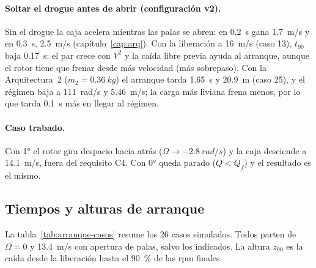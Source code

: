 \paragraph{Soltar el drogue antes de abrir (configuración v2).} Sin el drogue la caja
acelera mientras las palas se abren: en \SI{0.2}{s} gana \SI{1.7}{m/s} y en \SI{0.3}{s},
\SI{2.5}{m/s} (capítulo~\ref{cap:arq}). Con la liberación a \SI{16}{m/s} (caso 13),
$t_{90}$ baja \SI{0.17}{s}: el par crece con $V^2$ y la caída libre previa ayuda al
arranque, aunque el rotor tiene que frenar desde más velocidad (más sobrepaso). Con la
Arquitectura~2 ($m_2=\SI{0.36}{kg}$) el arranque tarda \SI{1.65}{s} y \SI{20.9}{m}
(caso 25), y el régimen baja a \SI{111}{rad/s} y \SI{5.46}{m/s}; la carga más liviana frena
menos, por lo que tarda \SI{0.1}{s} más en llegar al régimen.

\paragraph{Caso trabado.} Con \ang{+1} el rotor gira despacio hacia atrás
($\Omega\to\SI{-2.8}{rad/s}$) y la caja desciende a \SI{14.1}{m/s}, fuera del requisito
C4. Con \ang{0} queda parado ($Q<Q_f$) y el resultado es el mismo.

\subsection{Tiempos y alturas de arranque}

La tabla~\ref{tab:arranque-casos} resume los 26 casos simulados. Todos parten de
$\Omega=0$ y \SI{13.4}{m/s} con apertura de palas, salvo los indicados. La altura $z_{90}$ es
la caída desde la liberación hasta el \SI{90}{\percent} de las rpm finales.

